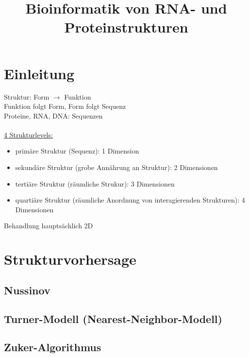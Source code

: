 \documentclass[12pt]{article}
\title{\Huge\textbf{Bioinformatik von RNA- und Proteinstrukturen}}
\author{}
\date{}
\begin{document}
\begin{titlepage}

\maketitle
\thispagestyle{empty}
\end{titlepage}
\newpage

\begin{titlepage}
\tableofcontents{}
\thispagestyle{empty}
\end{titlepage}
\newpage

\section{Einleitung}

Struktur: Form $\rightarrow$ Funktion\\
Funktion folgt Form, Form folgt Sequenz\\
Proteine, RNA, DNA: Sequenzen\\
\\
\underline{4 Strukturlevels:}
\begin{itemize}
	\item primäre Struktur (Sequenz): 1 Dimension
	\item sekundäre Struktur (grobe Annährung an Struktur): 2 Dimensionen
	\item tertiäre Struktur (räumliche Strukur): 3 Dimensionen
	\item quartiäre Struktur (räumliche Anordnung von interagierenden Strukturen): 4 Dimensionen
\end{itemize}
%
Behandlung hauptsächlich 2D

\section{Strukturvorhersage}

\subsection{Nussinov}

\subsection{Turner-Modell (Nearest-Neighbor-Modell)}

\subsection{Zuker-Algorithmus}
\end{document}
